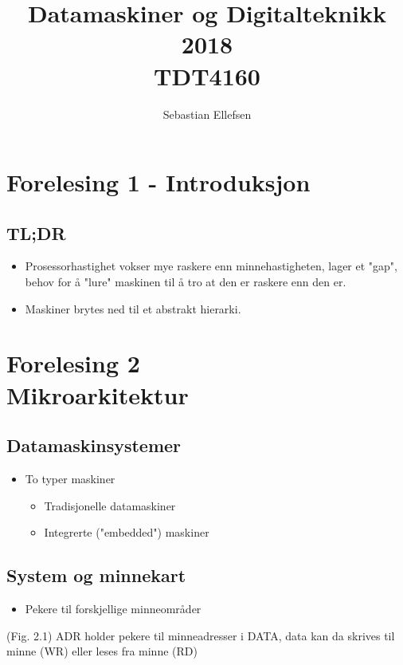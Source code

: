 \documentclass{article}
\author{Sebastian Ellefsen}
\title{%
		Datamaskiner og Digitalteknikk 2018 \\
		\large TDT4160}
\begin{document}
	\maketitle
	\section{Forelesing 1 - Introduksjon}
		\subsection{TL;DR}
			\begin{itemize}
				\item Prosessorhastighet vokser mye raskere enn minnehastigheten, lager et "gap", behov for å "lure" maskinen til å tro at den er raskere enn den er.
				\item Maskiner brytes ned til et abstrakt hierarki.
			\end{itemize}
	\section{%
		Forelesing 2 \\
		\small Mikroarkitektur}
		\subsection{Datamaskinsystemer}
			\begin{itemize}
				\item To typer maskiner
					\begin{itemize}
						\item Tradisjonelle datamaskiner
						\item Integrerte ("embedded") maskiner 
					\end{itemize}
			\end{itemize}
		\subsection{System og minnekart}
			\begin{itemize}
				\item Pekere til forskjellige minneområder
			\end{itemize}
			(Fig. 2.1) \newline
			ADR holder pekere til minneadresser i DATA, data kan da skrives til minne (WR) eller leses fra minne (RD) 
\end{document}
